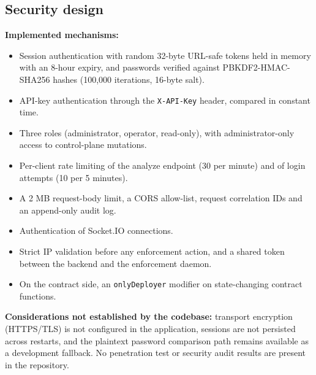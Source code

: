 \documentclass[12pt,a4paper]{report}
\begin{document}
\subsection{Security design}
\textbf{Implemented mechanisms:}
\begin{itemize}
    \item Session authentication with random 32-byte URL-safe tokens held in memory with an 8-hour expiry, and passwords verified against PBKDF2-HMAC-SHA256 hashes (100{,}000 iterations, 16-byte salt).
    \item API-key authentication through the \texttt{X-API-Key} header, compared in constant time.
    \item Three roles (administrator, operator, read-only), with administrator-only access to control-plane mutations.
    \item Per-client rate limiting of the analyze endpoint (30 per minute) and of login attempts (10 per 5 minutes).
    \item A 2 MB request-body limit, a CORS allow-list, request correlation IDs and an append-only audit log.
    \item Authentication of Socket.IO connections.
    \item Strict IP validation before any enforcement action, and a shared token between the backend and the enforcement daemon.
    \item On the contract side, an \texttt{onlyDeployer} modifier on state-changing contract functions.
\end{itemize}
\textbf{Considerations not established by the codebase:} transport encryption (HTTPS/TLS) is not configured in the application, sessions are not persisted across restarts, and the plaintext password comparison path remains available as a development fallback. No penetration test or security audit results are present in the repository.

\newpage
\end{document}
